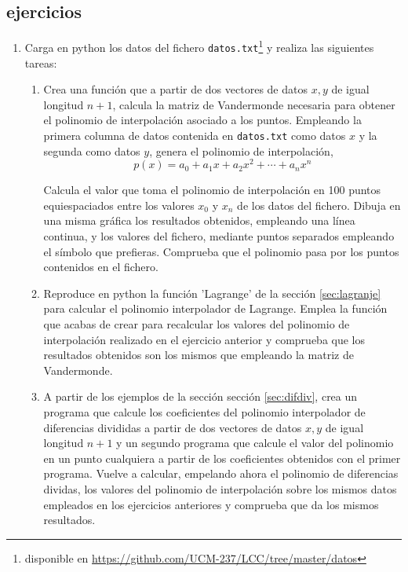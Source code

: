 \begin{paracol}{2}
\section{ejercicios}
\begin{enumerate}
\item Carga en python los datos del fichero \texttt{datos.txt}\footnote{disponible en \url{https://github.com/UCM-237/LCC/tree/master/datos}} y realiza las siguientes tareas:
\begin{enumerate}
\item \label{ej1a} Crea una función que a partir de dos vectores de datos $x,y$ de igual longitud $n+1$, calcula la matriz de Vandermonde necesaria   para obtener el polinomio de interpolación asociado a los puntos. Empleando la primera columna de datos contenida en \texttt{datos.txt} como datos $x$ y la segunda como datos $y$, genera el polinomio de interpolación,
\begin{equation*}
p(x)=a_0+a_1x+a_2x^2+\cdots+a_nx^n
\end{equation*}

Calcula el valor que toma el polinomio de interpolación en 100 puntos equiespaciados entre los valores $x_0$ y $x_{n}$ de los datos del fichero. Dibuja en una misma gráfica los resultados obtenidos, empleando una línea continua, y los valores del fichero, mediante puntos separados empleando el símbolo que prefieras. Comprueba que el polinomio pasa por los puntos contenidos en el fichero.

\item Reproduce en python la función 'Lagrange' de la sección \ref{sec:lagranje} para calcular el polinomio interpolador de Lagrange. Emplea la función que acabas de crear para recalcular los valores del polinomio de interpolación realizado en el ejercicio anterior y comprueba que los resultados obtenidos son los mismos que empleando la matriz de Vandermonde.

\item A partir de los ejemplos de la sección  sección \ref{sec:difdiv}, crea un programa que calcule los coeficientes del polinomio interpolador de diferencias divididas a partir de dos vectores de datos  $x,y$ de igual longitud $n+1$ y un segundo programa que calcule el valor del polinomio en un punto cualquiera a partir de los coeficientes obtenidos con el primer programa. Vuelve a calcular, empelando ahora el polinomio de diferencias dividas, los valores del polinomio de interpolación sobre los mismos datos empleados en los ejercicios anteriores y comprueba que da los mismos resultados.


\end{enumerate}
\end{enumerate}
\end{paracol}
